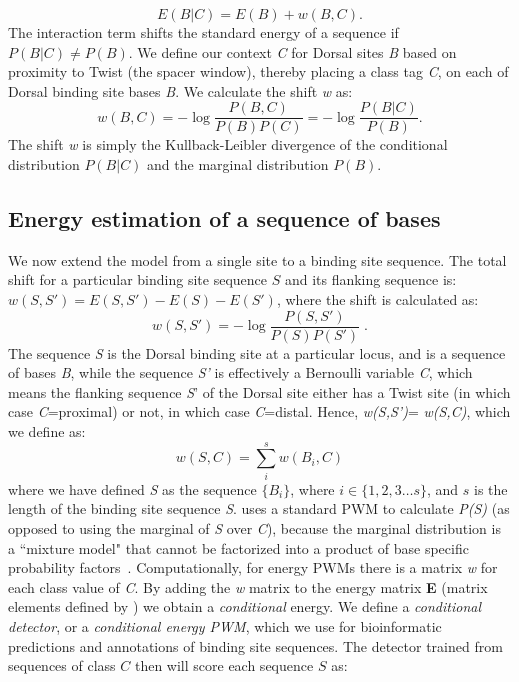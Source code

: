 \begin{equation}
E(B|C) =E(B)+ w(B,C).
\end{equation}
The interaction term shifts the standard energy of a sequence if $P(B|C) \neq P(B)$.  We define our context \textit{C} for Dorsal sites \textit{B} based on proximity to Twist (the spacer window),  thereby placing a class tag \textit{C}, on each of Dorsal binding site bases \textit{B}.   We calculate the shift \textit{w} as:
\begin{equation}
w(B,C) =- \log{ \frac{P(B,C)}{P(B)P(C)}}=-\log{\frac{P(B|C)}{P(B)}}.
\end{equation}
The shift \textit{w} is simply the Kullback-Leibler divergence of the conditional distribution $P(B|C)$ and the marginal distribution $P(B)$.  

\subsection{Energy estimation of a sequence of bases}
We now extend the model from a single site to a binding site sequence.  The total shift for a particular binding site sequence $S$ and its flanking sequence is: $w(S,S') = E(S,S') -E(S) -E(S')$, where the shift is calculated as:
\begin{equation}
w(S,S')=  -\log{ \frac{P(S,S')}{P(S)P(S')}}\;.
\end{equation}
The sequence \textit{S} is the Dorsal binding site at a particular locus, and is a sequence of bases \textit{B}, while the sequence \textit{S'} is effectively a Bernoulli variable \textit{C}, which means the flanking sequence \textit{S}' of the Dorsal site either has a Twist site (in which case \textit{C}=proximal) or not, in which case \textit{C}=distal.  Hence, \textit{w(S,S')}= \textit{w(S,C)}, which we define as:
\begin{equation}\label{mibase}
w(S,C)= \sum_i^s w(B_i,C)
\end{equation}
where we have defined \textit{S} as the sequence $\{B_i\}$, where $ i \in \{1,2,3\dots s \}$, and $s$ is the length of the binding site sequence \textit{S}.   uses a standard PWM to calculate \textit{P(S)} (as opposed to using the marginal of \textit{S} over \textit{C}), because the marginal distribution is a ``mixture model" that cannot be factorized into a product of base specific probability factors~\cite{barasch}.
  Computationally, for energy PWMs there is a matrix \textit{w} for each class value of \textit{C}.  By adding the \textit{w} matrix to the energy matrix \textbf{E} (matrix elements defined by ) we obtain a {\em conditional} energy.  We define a {\em conditional detector}, or a {\em conditional energy PWM}, which we use for bioinformatic predictions and annotations of binding site sequences.  The detector trained from sequences of class $C$ then will score each sequence $S$ as:
